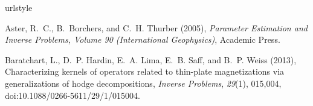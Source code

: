 \documentclass[draft,gc]{agutex}
\begin{document}
\begin{article}
%
%
%
%
%
%

%
%
%

%
%


%
%
%

\begin{thebibliography}{39}
\providecommand{\natexlab}[1]{#1}
\expandafter\ifx\csname urlstyle\endcsname\relax
  \providecommand{\doi}[1]{doi:\discretionary{}{}{}#1}\else
  \providecommand{\doi}{doi:\discretionary{}{}{}\begingroup
  \urlstyle{rm}\Url}\fi

Aster, R.~C., B.~Borchers, and C.~H. Thurber (2005), \textit{Parameter
  Estimation and Inverse Problems, Volume 90 (International Geophysics)},
  Academic Press.

Baratchart, L., D.~P. Hardin, E.~A. Lima, E.~B. Saff, and B.~P. Weiss (2013),
  Characterizing kernels of operators related to thin-plate magnetizations via
  generalizations of hodge decompositions, \textit{Inverse Problems},
  \textit{29}(1), 015,004, \doi{10.1088/0266-5611/29/1/015004}.


\end{thebibliography}
\end{article}
\end{document}
